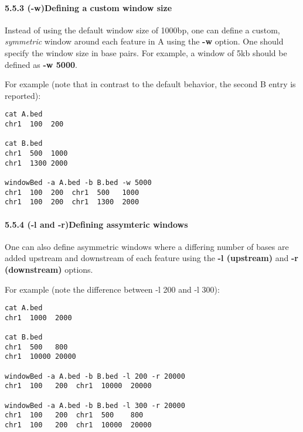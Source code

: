 \documentclass[letterpaper,10pt,english]{sphinxmanual}
\begin{document}
\paragraph{5.5.3 (-w)Defining a custom window size}
\label{content/windowBed:w-defining-a-custom-window-size}
Instead of using the default window size of 1000bp, one can define a custom, \emph{symmetric} window around
each feature in A using the \textbf{-w} option. One should specify the window size in base pairs. For example,
a window of 5kb should be defined as \textbf{-w 5000}.

For example (note that in contrast to the default behavior, the second B entry is reported):

\begin{Verbatim}[commandchars=\\\{\}]
cat A.bed
chr1  100  200

cat B.bed
chr1  500  1000
chr1  1300 2000

windowBed -a A.bed -b B.bed -w 5000
chr1  100  200  chr1  500   1000
chr1  100  200  chr1  1300  2000
\end{Verbatim}


\paragraph{5.5.4 (-l and -r)Defining assymteric windows}
\label{content/windowBed:l-and-r-defining-assymteric-windows}
One can also define asymmetric windows where a differing number of bases are added upstream and
downstream of each feature using the \textbf{-l (upstream)} and \textbf{-r (downstream)} options.

For example (note the difference between -l 200 and -l 300):

\begin{Verbatim}[commandchars=\\\{\}]
cat A.bed
chr1  1000  2000

cat B.bed
chr1  500   800
chr1  10000 20000

windowBed -a A.bed -b B.bed -l 200 -r 20000
chr1  100   200  chr1  10000  20000

windowBed -a A.bed -b B.bed -l 300 -r 20000
chr1  100   200  chr1  500    800
chr1  100   200  chr1  10000  20000
\end{Verbatim}
\end{document}

